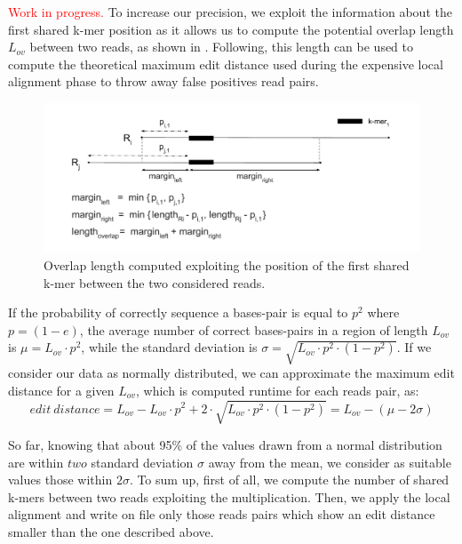 \documentclass[11pt]{article}
\newcommand\myworries[1]{\textcolor{red}{#1}}
\begin{document}
\myworries{Work in progress.} To increase our precision, we exploit the information about the first shared k-mer position as it allows us to compute the potential overlap length $L_{ov}$ between two reads, as shown in .
Following, this length can be used to compute the theoretical maximum edit distance used during the expensive local alignment phase to throw away false positives read pairs.
\begin{figure}
    \centering
    \includegraphics[width=\textwidth]{image/Ovlen.pdf}
    \caption{Overlap length computed exploiting the position of the first shared k-mer between the two considered reads.}
    \label{fig:ovlen}
\end{figure}
If the probability of correctly sequence a bases-pair is equal to $p^2$ where $p=(1-e)$, the average number of correct bases-pairs in a region of length $L_{ov}$ is $\mu = L_{ov} \cdot p^2$, while the standard deviation is $\sigma = \sqrt{L_{ov}\cdot p^2 \cdot (1-p^2)}$.
If we consider our data as normally distributed, we can approximate the maximum edit distance for a given $L_{ov}$, which is computed runtime for each reads pair, as:
$$edit~distance = L_{ov}-L_{ov}\cdot p^2+2\cdot\sqrt{L_{ov}\cdot p^2\cdot (1-p^2)} = L_{ov}-(\mu-2\sigma)$$

So far, knowing that about 95\% of the values drawn from a normal distribution are within $two$ standard deviation $\sigma$ away from the mean, we consider as suitable values those within $2\sigma$.
To sum up, first of all, we compute the number of shared k-mers between two reads exploiting the multiplication.
Then, we apply the local alignment and write on file only those reads pairs which show an edit distance smaller than the one described above.
\end{document}
